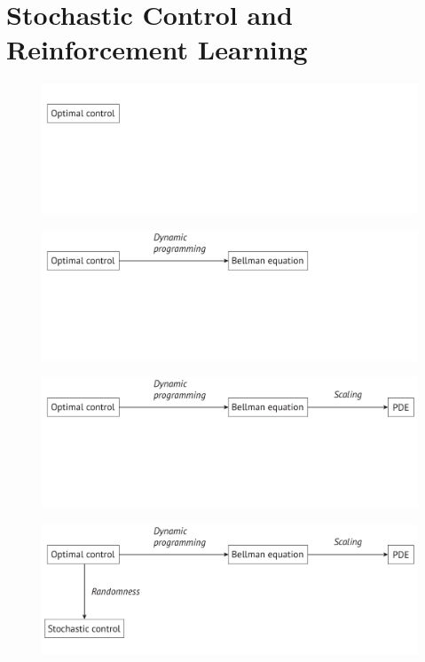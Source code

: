 \documentclass{beamer}
\begin{document}
\section{Stochastic Control and Reinforcement Learning}
\frame{\tableofcontents[currentsection]}
\begin{frame}
\begin{figure}
\includegraphics[scale  = 0.35]{figures/bellman_ml_1.pdf}
\end{figure}
\end{frame}
\begin{frame}
\begin{figure}
\includegraphics[scale  = 0.35]{figures/bellman_ml_2.pdf}
\end{figure}
\end{frame}
\begin{frame}
\begin{figure}
\includegraphics[scale  = 0.35]{figures/bellman_ml_3.pdf}
\end{figure}
\end{frame}
\begin{frame}
\begin{figure}
\includegraphics[scale  = 0.35]{figures/bellman_ml_4.pdf}
\end{figure}
\end{frame}
\end{document}
